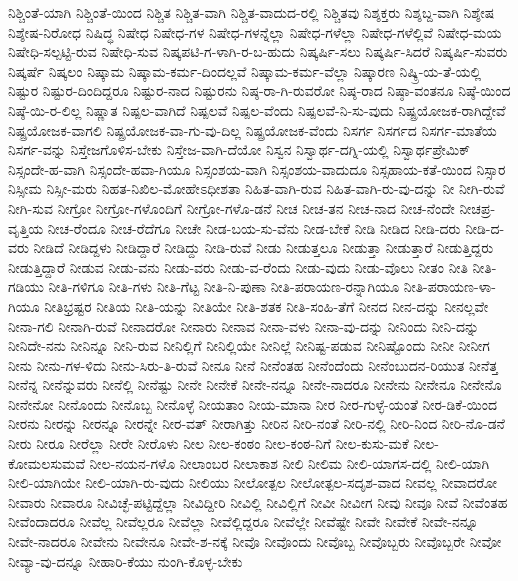 ನಿಶ್ಚಿಂತೆ-ಯಾಗಿ
ನಿಶ್ಚಿಂತೆ-ಯಿಂದ
ನಿಶ್ಚಿತ
ನಿಶ್ಚಿತ-ವಾಗಿ
ನಿಶ್ಚಿತ-ವಾದುದ-ರಲ್ಲಿ
ನಿಶ್ಚಿತವು
ನಿಶ್ಶಕ್ತರು
ನಿಶ್ಶಬ್ದ-ವಾಗಿ
ನಿಶ್ಶೇಷ
ನಿಶ್ಶೇಷ-ನಿರೋಧ
ನಿಷಿದ್ಧ
ನಿಷೇಧ
ನಿಷೇಧ-ಗಳ
ನಿಷೇಧ-ಗಳನ್ನೆಲ್ಲಾ
ನಿಷೇಧ-ಗಳೆಲ್ಲಾ
ನಿಷೇಧ-ಗಳೆಲ್ಲಿವೆ
ನಿಷೇಧ-ಮಯ
ನಿಷೇಧಿ-ಸಲ್ಪಟ್ಟಿ-ರುವ
ನಿಷೇಧಿ-ಸುವ
ನಿಷ್ಕಪಟಿ-ಗ-ಳಾಗಿ-ರ-ಬ-ಹುದು
ನಿಷ್ಕರ್ಷಿ-ಸಲು
ನಿಷ್ಕರ್ಷಿ-ಸಿದರೆ
ನಿಷ್ಕರ್ಷಿ-ಸುವರು
ನಿಷ್ಕರ್ಷೆ
ನಿಷ್ಕಲಂ
ನಿಷ್ಕಾಮ
ನಿಷ್ಕಾಮ-ಕರ್ಮ-ದಿಂದಲ್ಲವೆ
ನಿಷ್ಕಾಮ-ಕರ್ಮ-ವೆಲ್ಲಾ
ನಿಷ್ಕಾರಣ
ನಿಷ್ಕ್ರಿ-ಯ-ತೆ-ಯಲ್ಲಿ
ನಿಷ್ಟುರ
ನಿಷ್ಟುರ-ದಿಂದಿದ್ದರೂ
ನಿಷ್ಟುರ-ನಾದ
ನಿಷ್ಟುರನು
ನಿಷ್ಠ-ರಾ-ಗಿ-ರುವರೋ
ನಿಷ್ಠ-ರಾದ
ನಿಷ್ಠಾ-ವಂತನೂ
ನಿಷ್ಠೆ-ಯಿಂದ
ನಿಷ್ಠೆ-ಯಿ-ರ-ಲಿಲ್ಲ
ನಿಷ್ಣಾತ
ನಿಷ್ಪಲ-ವಾಗಿದೆ
ನಿಷ್ಪಲವೆ
ನಿಷ್ಪಲ-ವೆಂದು
ನಿಷ್ಪಲವೆ-ನಿ-ಸು-ವುದು
ನಿಷ್ಪ್ರಯೋಜಕ-ರಾಗಿದ್ದೇವೆ
ನಿಷ್ಪ್ರಯೋಜಕ-ವಾಗಲಿ
ನಿಷ್ಪ್ರಯೋಜಕ-ವಾ-ಗು-ವು-ದಿಲ್ಲ
ನಿಷ್ಪ್ರಯೋಜಕ-ವೆಂದು
ನಿಸರ್ಗ
ನಿಸರ್ಗದ
ನಿಸರ್ಗ-ಮಾತೆಯ
ನಿಸರ್ಗ-ವನ್ನು
ನಿಸ್ತೇಜಗೊಳಿಸ-ಬೇಕು
ನಿಸ್ತೇಜ-ವಾಗಿ-ದೆಯೋ
ನಿಸ್ವನ
ನಿಸ್ವಾರ್ಥ-ದಗ್ನಿ-ಯಲ್ಲಿ
ನಿಸ್ವಾರ್ಥಪ್ರೇಮಿಕ್
ನಿಸ್ಸಂದೇ-ಹ-ವಾಗಿ
ನಿಸ್ಸಂದೇ-ಹವಾ-ಗಿಯೂ
ನಿಸ್ಸಂಶಯ-ವಾಗಿ
ನಿಸ್ಸಂಶಯ-ವಾದುದೂ
ನಿಸ್ಸಹಾಯ-ಕತೆ-ಯಿಂದ
ನಿಸ್ಸಾರ
ನಿಸ್ಸೀಮ
ನಿಸ್ಸೀ-ಮರು
ನಿಹತ-ನಿಖಿಲ-ಮೋಹೇಽಧೀಶತಾ
ನಿಹಿತ-ವಾಗಿ-ರುವ
ನಿಹಿತ-ವಾಗಿ-ರು-ವು-ದನ್ನು
ನೀ
ನೀಗಿ-ರುವೆ
ನೀಗಿ-ಸುವ
ನೀಗ್ರೋ
ನೀಗ್ರೋ-ಗಳೊಂದಿಗೆ
ನೀಗ್ರೋ-ಗಳೊ-ಡನೆ
ನೀಚ
ನೀಚ-ತನ
ನೀಚ-ನಾದ
ನೀಚ-ನೆಂದೇ
ನೀಚಪ್ರ-ವೃತ್ತಿಯ
ನೀಚ-ರೆಂದೂ
ನೀಚ-ರೆದೆಗೂ
ನೀಚೇ
ನೀಡ-ಬಯ-ಸು-ವೆನು
ನೀಡ-ಬೇಕೆ
ನೀಡಿ
ನೀಡಿದ
ನೀಡಿ-ದರು
ನೀಡಿ-ದ-ವರು
ನೀಡಿದೆ
ನೀಡಿದ್ದಳು
ನೀಡಿದ್ದಾರೆ
ನೀಡಿದ್ದು
ನೀಡಿ-ರುವೆ
ನೀಡು
ನೀಡುತ್ತಲೂ
ನೀಡುತ್ತಾ
ನೀಡುತ್ತಾರೆ
ನೀಡುತ್ತಿದ್ದರು
ನೀಡುತ್ತಿದ್ದಾರೆ
ನೀಡುವ
ನೀಡು-ವನು
ನೀಡು-ವರು
ನೀಡು-ವ-ರೆಂದು
ನೀಡು-ವುದು
ನೀಡು-ವೊಲು
ನೀತಂ
ನೀತಿ
ನೀತಿ-ಗಡಿಯು
ನೀತಿ-ಗಳಿಗೂ
ನೀತಿ-ಗಳು
ನೀತಿ-ಗೆಟ್ಟ
ನೀತಿ-ನಿ-ಪುಣಾ
ನೀತಿ-ಪರಾಯಣ-ರನ್ನಾಗಿಯೂ
ನೀತಿ-ಪರಾಯಣ-ಳಾ-ಗಿಯೂ
ನೀತಿಭ್ರಷ್ಟರ
ನೀತಿಯ
ನೀತಿ-ಯನ್ನು
ನೀತಿಯೇ
ನೀತಿ-ಶತಕ
ನೀತಿ-ಸಂಹಿ-ತೆಗೆ
ನೀನದ
ನೀನ-ದನ್ನು
ನೀನಲ್ಲವೇ
ನೀನಾ-ಗಲಿ
ನೀನಾಗಿ-ರುವೆ
ನೀನಾದರೋ
ನೀನಾರು
ನೀನಾವ
ನೀನಾ-ವಳು
ನೀನಾ-ವು-ದನ್ನು
ನೀನಿಂದು
ನೀನಿ-ದನ್ನು
ನೀನಿದೇ-ನನು
ನೀನಿನ್ನೂ
ನೀನಿ-ರುವ
ನೀನಿಲ್ಲಿಗೆ
ನೀನಿಲ್ಲಿಯೇ
ನೀನಿಲ್ಲೆ
ನೀನಿಷ್ಟ-ಪಡುವ
ನೀನಿಷ್ಟೊಂದು
ನೀನೀ
ನೀನೀಗ
ನೀನು
ನೀನು-ಗಳ-ಳಿದು
ನೀನು-ಸಿರು-ತಿ-ರುವೆ
ನೀನೂ
ನೀನೆ
ನೀನೆಂತಹ
ನೀನೆಂದೆಂದು
ನೀನೆಂಬುದನ-ರಿಯುತ
ನೀನೆತ್ತ
ನೀನೆನ್ನ
ನೀನೆನ್ನುವರು
ನೀನೆಲ್ಲಿ
ನೀನೆಷ್ಟು
ನೀನೇ
ನೀನೇಕೆ
ನೀನೇ-ನನ್ನೂ
ನೀನೇ-ನಾದರೂ
ನೀನೇನು
ನೀನೇನೂ
ನೀನೇನೊ
ನೀನೇನೋ
ನೀನೊಂದು
ನೀನೊಬ್ಬ
ನೀನೊಳ್ಳೆ
ನೀಯತಾಂ
ನೀಯ-ಮಾನಾ
ನೀರ
ನೀರ-ಗುಳ್ಳೆ-ಯಂತೆ
ನೀರ-ಡಿಕೆ-ಯಿಂದ
ನೀರನು
ನೀರನ್ನು
ನೀರನ್ನೂ
ನೀರನ್ನೇ
ನೀರ-ವತ್
ನೀರಾಗಿತ್ತು
ನೀರಿನ
ನೀರಿ-ನಂತೆ
ನೀರಿ-ನಲ್ಲಿ
ನೀರಿ-ನಿಂದ
ನೀರಿ-ನೊ-ಡನೆ
ನೀರು
ನೀರೂ
ನೀರೆಲ್ಲಾ
ನೀರೇ
ನೀರೊಳು
ನೀಲ
ನೀಲ-ಕಂಠಂ
ನೀಲ-ಕಂಠ-ನಿಗೆ
ನೀಲ-ಕುಸು-ಮಕೆ
ನೀಲ-ಕೋಮಲಸುಮವೆ
ನೀಲ-ನಯನ-ಗಳೊ
ನೀಲಾಂಬರ
ನೀಲಾಕಾಶ
ನೀಲಿ
ನೀಲಿಮ
ನೀಲಿ-ಯಾಗಸ-ದಲ್ಲಿ
ನೀಲಿ-ಯಾಗಿ
ನೀಲಿ-ಯಾಗಿಯೇ
ನೀಲಿ-ಯಾಗಿ-ರು-ವುದು
ನೀಲಿಯು
ನೀಲೋತ್ಪಲ
ನೀಲೋತ್ಪಲ-ಸದೃಶ-ವಾದ
ನೀವಲ್ಲ
ನೀವಾದರೋ
ನೀವಾರು
ನೀವಾರೂ
ನೀವಿಚ್ಛೆ-ಪಟ್ಟಿದ್ದೆಲ್ಲಾ
ನೀವಿದ್ದೀರಿ
ನೀವಿಲ್ಲಿ
ನೀವಿಲ್ಲಿಗೆ
ನೀವೀ
ನೀವೀಗ
ನೀವು
ನೀವೂ
ನೀವೆ
ನೀವೆಂತಹ
ನೀವೆಂದಾದರೂ
ನೀವೆಲ್ಲ
ನೀವೆಲ್ಲರೂ
ನೀವೆಲ್ಲಾ
ನೀವೆಲ್ಲಿದ್ದರೂ
ನೀವೆಲ್ಲೇ
ನೀವೆಷ್ಟೇ
ನೀವೇ
ನೀವೇಕೆ
ನೀವೇ-ನನ್ನೂ
ನೀವೇ-ನಾದರೂ
ನೀವೇನು
ನೀವೇನೂ
ನೀವೇ-ಶ-ನಕ್ಕೆ
ನೀವೊ
ನೀವೊಂದು
ನೀವೊಬ್ಬ
ನೀವೊಬ್ಬರು
ನೀವೊಬ್ಬರೇ
ನೀವೋ
ನೀವ್ಯಾ-ವು-ದನ್ನೂ
ನೀಹಾರಿ-ಕೆಯು
ನುಂಗಿ-ಕೊಳ್ಳ-ಬೇಕು
